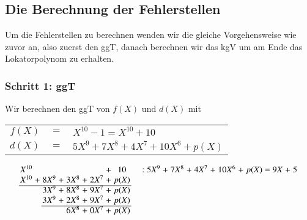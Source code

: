 \subsection{Die Berechnung der Fehlerstellen
	\label{reedsolomon:subsection:nachrichtenvektor}}
%
Um die Fehlerstellen zu berechnen wenden wir die gleiche Vorgehensweise wie zuvor an, also zuerst den ggT, danach berechnen wir das kgV um am Ende das Lokatorpolynom zu erhalten.

\subsubsection{Schritt 1: ggT}

Wir berechnen den ggT von $f(X)$ und $d(X)$ mit
\begin{center}
\begin{tabular}{r c l}
	$f(X)$ & $=$ & $X^{10} - 1 = X^{10} + 10$ \\
	$d(X)$ & $=$ & $5X^9 + 7X^8 + 4X^7 + 10X^6 + p(X)$
\end{tabular}
\end{center} 
%
%
%
%
%
\[
\arraycolsep=1.4pt
\begin{array}{rcrcrcrcccrcrcrcrcrcrcrcrcr}
	X^{10}& & & & & & &+& 10& & & & &:&5X^9&+&7X^8&+& 4X^7&+&10X^6&+&p(X)&=&9X&+&5\\
	X^{10}&+& 8X^9&+& 3X^8&+&2X^7&+& p(X)& &  & & & &   & & & & & &   & &  & & \\ \cline{1-9}
	&& 3X^9&+& 8X^8&+& 9X^7&+& p(X)& &   & & & & & &   & &  & & \\
	&& 3X^9&+& 2X^8&+& 9X^7&+& p(X)& &   & & & & & &   & &  & & \\ \cline{3-9}
	& &    & &6X^8&+&0X^7&+&p(X)& &   & & & & & &   & &  & & \\
\end{array}
\]

